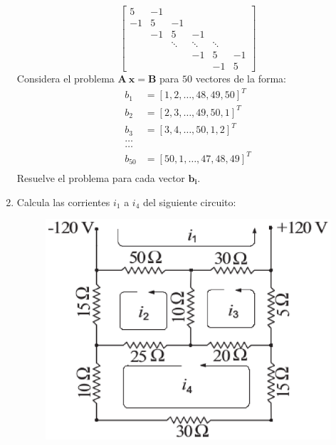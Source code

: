 \documentclass[12pt]{article}
\numberwithin{equation}{section}
\begin{document}
\begin{enumerate}
\[\begin{bmatrix}
5 & -1 & & & & \\
-1 & 5 & -1 & & &  \\
 & -1 & 5 & -1 & & \\
 & & \ddots & \ddots & \ddots & \\
 & & & -1 & 5 & -1 \\
 & & & & -1 & 5
\end{bmatrix}
\]
Considera el problema $\mathbf{A \: x = B}$ para $50$ vectores de la forma:
\begin{align*}
b_{1} &= [1, 2, \ldots, 48, 49, 50]^{T} \\
b_{2} &= [2, 3, \ldots, 49, 50, 1]^{T} \\
b_{3} &= [3, 4, \ldots, 50, 1, 2]^{T} \\
\ldots \\
\ldots \\
b_{50} &= [50, 1, \ldots, 47, 48, 49]^{T} \\
\end{align*}
Resuelve el problema para cada vector $\mathbf{b_{i}}$.
\item Calcula las corrientes $i_{1}$ a $i_{4}$ del siguiente circuito:
\begin{figure}[H]
	\centering
	\includegraphics[scale=0.7]{Imagenes/Circuito_Tarea_2018_2.eps}
\end{figure}
\end{enumerate}	
\end{document}
